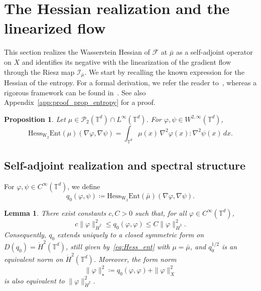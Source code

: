 \documentclass[11pt]{article}
\numberwithin{equation}{section}
\newtheorem{lemma}[theorem]{Lemma}
\newtheorem{proposition}[theorem]{Proposition}
\theoremstyle{definition}
\newcommand{\T}{\mathbb{T}}
\newcommand{\Pcal}{\mathcal{P}}
\newcommand{\F}{\mathcal{F}}
\newcommand{\Wtwo}{\operatorname{W}_2}
\newcommand{\rieszmap}[1][\mu]{\mathcal{I}_{#1}}
\newcommand{\dotHk}[1][k]{\dot{H}^{#1}}
\begin{document}
\section{The Hessian realization and the linearized flow}
\label{sec:hessian}

This section realizes the Wasserstein Hessian of $\F$ at $\bar\mu$ as a self-adjoint operator on $X$ and identifies its negative with the linearization of the gradient flow through the Riesz map $\rieszmap[\bar\mu]$. 
We start by recalling the known expression for the Hessian of the entropy.
For a formal derivation, we refer the reader to~\cite[Section 9.1]{Villani2003}, whereas a rigorous framework can be found in~\cite{Lott2008, Gigli2012}.
See also Appendix~\ref{app:proof_prop_entropy} for a proof.

\begin{proposition}
    \label{prop:entropy_hessian}
    Let $\mu \in \Pcal_2(\T^d) \cap L^\infty(\T^d)$.
    For $\varphi, \psi\in W^{2,\infty}(\T^d)$,
    \begin{equation}\label{eq:Hess_ent}
        \mathrm{Hess}_{\Wtwo} \mathrm{Ent}(\mu) (\nabla \varphi, \nabla \psi) = \int_{\T^d} \mu(x)\,\nabla^2\varphi(x) : \nabla^2\psi(x) \, dx.
    \end{equation}
\end{proposition}

\subsection{Self-adjoint realization and spectral structure}

For $\varphi, \psi \in C^\infty(\T^d)$, we define
\begin{equation}
    \label{eq:q0_def}
    q_0(\varphi, \psi) \coloneqq \mathrm{Hess}_{\Wtwo}\mathrm{Ent}(\bar\mu)(\nabla \varphi, \nabla \psi).
\end{equation}

\begin{lemma}
    \label{lem:h2_coercivity}
    There exist constants $c, C > 0$ such that, for all $\varphi \in C^\infty(\T^d)$,
    \begin{equation}
        \label{eq:h2_inequality_q0}
        c\|\varphi\|_{\dotHk[2]}^2 \le q_0(\varphi, \varphi) \le C\|\varphi\|_{\dotHk[2]}^2.
    \end{equation}
    Consequently, $q_0$ extends uniquely to a closed symmetric form on $D(q_0) = \dotHk[2](\T^d)$, still given by~\eqref{eq:Hess_ent} with $\mu = \bar\mu$, and $q_0^{1/2}$ is an equivalent norm on $\dotHk[2](\T^d)$.
    Moreover, the form norm
    \[
    \|\varphi\|_\star^2 \coloneqq q_0(\varphi,\varphi) + \|\varphi\|_X^2
    \]
    is also equivalent to $\|\varphi\|_{\dotHk[2]}^2$.
\end{lemma}
\end{document}
